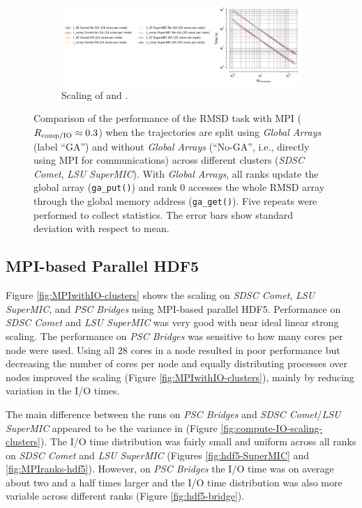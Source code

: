 \begin{figure}[!htb]
  \begin{subfigure}{\textwidth}
    \includegraphics[width=\linewidth]{figures/Clusters_IO_compute_scaling_splitting.pdf}
    \captionsetup{format=hang}
    \caption{Scaling of \tcomp and \tIO.}
    \label{fig:compute-IO-scaling-clusters-splitting}
  \end{subfigure}
  \caption{Comparison of the performance of the RMSD task with MPI ($R_{\text{comp/IO}} \approx 0.3$) when the trajectories are split using \emph{Global Arrays} (label ``GA'') and without \emph{Global Arrays} (``No-GA'', i.e., directly using MPI for communications) across different clusters (\emph{SDSC Comet}, \emph{LSU SuperMIC}). 
    With \emph{Global Arrays}, all ranks update the global array (\texttt{ga\_put()}) and rank 0 accesses the whole RMSD array through the global memory address (\texttt{ga\_get()}).
    Five repeats were performed to collect statistics.
    The error bars show standard deviation with respect to mean.}
\label{fig:MPI-splitting-clusters}
\end{figure} 

\subsection{MPI-based Parallel HDF5}
Figure \ref{fig:MPIwithIO-clusters} shows the scaling on \emph{SDSC Comet}, \emph{LSU SuperMIC}, and \emph{PSC Bridges} using MPI-based parallel HDF5.  
Performance on \emph{SDSC Comet} and \emph{LSU SuperMIC} was very good with near ideal linear strong scaling.
The performance on \emph{PSC Bridges} was sensitive to how many cores per node were used.
Using all 28 cores in a node resulted in poor performance but decreasing the number of cores per node and  equally distributing processes over nodes improved the scaling (Figure \ref{fig:MPIwithIO-clusters}), mainly by reducing variation in the I/O times.

The main difference between the runs on \emph{PSC Bridges} and \emph{SDSC Comet}/\emph{LSU SuperMIC} appeared to be the variance in \tIO (Figure \ref{fig:compute-IO-scaling-clusters}).
The I/O time distribution was fairly small and uniform across all ranks on \emph{SDSC Comet} and \emph{LSU SuperMIC} (Figures \ref{fig:hdf5-SuperMIC} and \ref{fig:MPIranks-hdf5}).
However, on \emph{PSC Bridges} the I/O time was on average about two and a half times larger and the I/O time distribution was also more variable across different ranks (Figure \ref{fig:hdf5-bridge}).  

